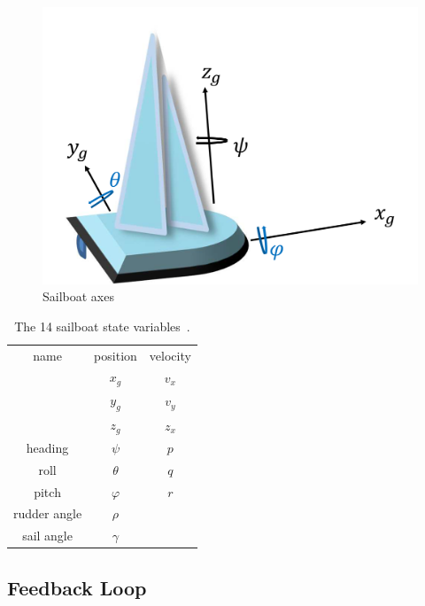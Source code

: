 \documentclass[conference]{IEEEtran}
\begin{document}
\begin{figure}
    \centering
    \includegraphics{documents/figures/alves_boat_with_buehler_axes.png}
    \caption{Sailboat axes~\cite{Alves2010}}
    \label{fig:sailboat_components}
\end{figure}
\begin{table}
    
    \centering
    \begin{tabular}{ccc}
    name & position & velocity \\
     &\(x_g\) & \(v_x\) \\
     &\(y_g\) & \(v_y\) \\
     &\(z_g\) & \(z_x\) \\
     heading&\(\psi\) & \(p\) \\
     \textcolor{officeblue}{roll} & \textcolor{officeblue}{\(\theta\)} & \textcolor{officeblue}{\(q\)} \\
     \textcolor{officeblue}{pitch}&\textcolor{officeblue}{\(\varphi\)} & \textcolor{officeblue}{\(r\)} \\
     \textcolor{officeblue}{rudder angle} & \textcolor{officeblue}{\(\rho\)} & \\
     \textcolor{officeblue}{sail angle}   & \textcolor{officeblue}{\(\gamma\)} & 
    \end{tabular}
    \caption{The 14 sailboat state variables~\cite{Buehler2018}.}
    \label{tab:state_vars}
\end{table}

\subsection{Feedback Loop}
\end{document}
